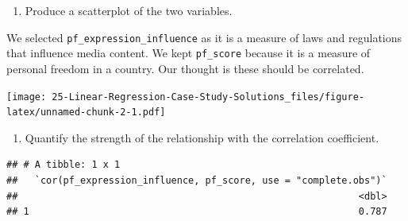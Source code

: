 \documentclass[
]{book}
\newenvironment{Shaded}{\begin{snugshade}}{\end{snugshade}}
\newcommand{\DataTypeTok}[1]{\textcolor[rgb]{0.13,0.29,0.53}{#1}}
\newcommand{\FloatTok}[1]{\textcolor[rgb]{0.00,0.00,0.81}{#1}}
\newcommand{\KeywordTok}[1]{\textcolor[rgb]{0.13,0.29,0.53}{\textbf{#1}}}
\newcommand{\NormalTok}[1]{#1}
\newcommand{\OperatorTok}[1]{\textcolor[rgb]{0.81,0.36,0.00}{\textbf{#1}}}
\newcommand{\StringTok}[1]{\textcolor[rgb]{0.31,0.60,0.02}{#1}}
\providecommand{\tightlist}{%
  \setlength{\itemsep}{0pt}\setlength{\parskip}{0pt}}
\begin{document}
\begin{enumerate}
\def\labelenumi{\alph{enumi}.}
\tightlist
\item
  Produce a scatterplot of the two variables.
\end{enumerate}

We selected \texttt{pf\_expression\_influence} as it is a measure of laws and regulations that influence media content. We kept \texttt{pf\_score} because it is a measure of personal freedom in a country. Our thought is these should be correlated.

\begin{Shaded}
\end{Shaded}

\texttt{[image: 25-Linear-Regression-Case-Study-Solutions\_files/figure-latex/unnamed-chunk-2-1.pdf]}

\begin{enumerate}
\def\labelenumi{\alph{enumi}.}
\setcounter{enumi}{1}
\tightlist
\item
  Quantify the strength of the relationship with the correlation coefficient.
\end{enumerate}

\begin{Shaded}
\end{Shaded}

\begin{verbatim}
## # A tibble: 1 x 1
##   `cor(pf_expression_influence, pf_score, use = "complete.obs")`
##                                                            <dbl>
## 1                                                          0.787
\end{verbatim}
\end{document}
